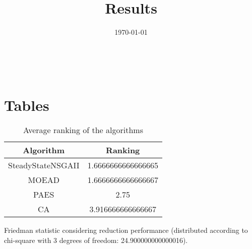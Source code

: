 \documentclass{article}
\title{Results}
\author{}
\date{\today}
\begin{document}
\oddsidemargin 0in \topmargin 0in\maketitle
\
\section{Tables}
\begin{table}[!htp]
\centering
\caption{Average ranking of the algorithms}
\begin{tabular}{c|c}
Algorithm&Ranking\\
\hline
SteadyStateNSGAII&1.6666666666666665\\
MOEAD&1.6666666666666667\\
PAES&2.75\\
CA&3.916666666666667\\
\end{tabular}
\end{table}


Friedman statistic considering reduction performance (distributed according to chi-square with 3 degrees of freedom: 24.900000000000016).
\end{document}
